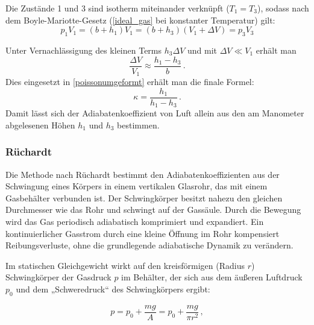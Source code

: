 Die Zustände 1 und 3 sind isotherm miteinander verknüpft (\(T_1 = T_3\)), sodass nach dem Boyle-Mariotte-Gesetz (\cref{ideal_gas} bei konstanter Temperatur) gilt:
\begin{equation}\label{CD_boyle}
    p_1 V_1 = (b + h_1) V_1 = (b + h_3) (V_1 + \Delta V) = p_3 V_3
\end{equation}

Unter Vernachlässigung des kleinen Terms \(h_3 \Delta V\) und mit \(\Delta V \ll V_1\) erhält man
\begin{equation}\label{CD_dV}
    \frac{\Delta V}{V_1} \approx \frac{h_1 - h_3}{b} \, .
\end{equation}
Dies eingesetzt in \cref{poissonumgeformt} erhält man die finale Formel:
\begin{equation}\label{CD_k_final}
    \kappa = \frac{h_1}{h_1 - h_3} \, .
\end{equation}
Damit lässt sich der Adiabatenkoeffizient von Luft allein aus den am Manometer abgelesenen Höhen \(h_1\) und \(h_3\) bestimmen.

\subsubsection{Rüchardt}

Die Methode nach Rüchardt bestimmt den Adiabatenkoeffizienten aus der Schwingung eines Körpers in einem vertikalen Glasrohr, das mit einem Gasbehälter verbunden ist. Der Schwingkörper besitzt nahezu den gleichen Durchmesser wie das Rohr und schwingt auf der Gassäule. Durch die Bewegung wird das Gas periodisch adiabatisch komprimiert und expandiert. Ein kontinuierlicher Gasstrom durch eine kleine Öffnung im Rohr kompensiert Reibungsverluste, ohne die grundlegende adiabatische Dynamik zu verändern.

Im statischen Gleichgewicht wirkt auf den kreisförmigen (Radius \(r\)) Schwingkörper der Gasdruck \(p\) im Behälter, der sich aus dem äußeren Luftdruck \(p_0\) und dem „Schweredruck“ des Schwingkörpers ergibt:

\begin{equation}\label{R_p}
    p = p_0 + \frac{m g}{A} = p_0 + \frac{mg}{\pi r^2}\, ,
\end{equation}

